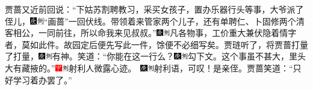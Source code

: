 {{{{{{{贾蔷又近前回说：“下姑苏割聘教习，采买女孩子，置办乐器行头等事，大爷派了侄儿，{\includegraphics[width=3mm]{../Images/00004}\includegraphics[width=3mm]{../Images/00011}\footnotesize \kaishu “画蔷”一回伏线。}带领着来管家两个儿子，还有单聘仁、卜固修两个清客相公，一同前往，所以命我来见叔叔。”{\includegraphics[width=3mm]{../Images/00004}\includegraphics[width=3mm]{../Images/00011}\footnotesize \kaishu 凡各物事，工价重大兼伏隐着情字者，莫如此件。故园定后便先写此一件，馀便不必细写矣。}贾琏听了，将贾蔷打量了打量，{\includegraphics[width=3mm]{../Images/00004}\includegraphics[width=3mm]{../Images/00011}\footnotesize \kaishu 有神。}笑道：“你能在这一行么？{\includegraphics[width=3mm]{../Images/00004}\includegraphics[width=3mm]{../Images/00011}\footnotesize \kaishu 勾下文。}这个事虽不甚大，里头大有藏掖的。”{\includegraphics[width=3mm]{../Images/00002}\includegraphics[width=3mm]{../Images/00011}\footnotesize \kaishu 射利人微露心迹。　\includegraphics[width=3mm]{../Images/00004}\includegraphics[width=3mm]{../Images/00011}\footnotesize \kaishu 射利语，可叹！是亲侄。}贾蔷笑道：“只好学习着办罢了。”

}}}}}}}

